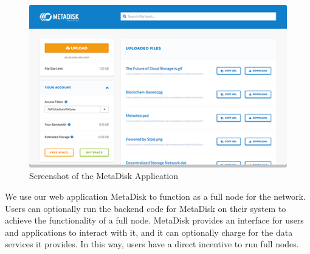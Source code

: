\documentclass[a4paper,10pt]{article}
\begin{document}
\begin{figure}[h!]
\centering
\includegraphics[width=\linewidth]{6}
\caption{Screenshot of the MetaDisk Application}
\end{figure}
We use our web application MetaDisk \cite{4} to function as a full node for the network. Users can optionally run the backend code for MetaDisk on their system to achieve the functionality of a full node. MetaDisk provides an interface for users and applications to interact with it, and it can optionally charge for the data services it provides. In this way, users have a direct incentive to run full nodes.  \\
\end{document}
